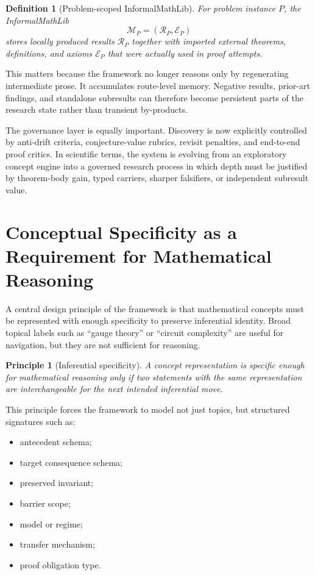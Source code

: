 \documentclass[11pt]{article}
\newtheorem{definition}{Definition}
\newtheorem{principle}{Principle}
\begin{document}
\begin{definition}[Problem-scoped InformalMathLib]
For problem instance $P$, the InformalMathLib
\[
\mathcal{M}_P = (\mathcal{R}_P, \mathcal{E}_P)
\]
stores locally produced results $\mathcal{R}_P$ together with imported external theorems, definitions, and axioms $\mathcal{E}_P$ that were actually used in proof attempts.
\end{definition}

This matters because the framework no longer reasons only by regenerating intermediate prose. It accumulates route-level memory. Negative results, prior-art findings, and standalone subresults can therefore become persistent parts of the research state rather than transient by-products.

The governance layer is equally important. Discovery is now explicitly controlled by anti-drift criteria, conjecture-value rubrics, revisit penalties, and end-to-end proof critics. In scientific terms, the system is evolving from an exploratory concept engine into a governed research process in which depth must be justified by theorem-body gain, typed carriers, sharper falsifiers, or independent subresult value.

\section{Conceptual Specificity as a Requirement for Mathematical Reasoning}

A central design principle of the framework is that mathematical concepts must be represented with enough specificity to preserve inferential identity. Broad topical labels such as ``gauge theory'' or ``circuit complexity'' are useful for navigation, but they are not sufficient for reasoning.

\begin{principle}[Inferential specificity]
A concept representation is specific enough for mathematical reasoning only if two statements with the same representation are interchangeable for the next intended inferential move.
\end{principle}

This principle forces the framework to model not just topics, but structured signatures such as:

\begin{itemize}[leftmargin=*,itemsep=0.2em]
\item antecedent schema;
\item target consequence schema;
\item preserved invariant;
\item barrier scope;
\item model or regime;
\item transfer mechanism;
\item proof obligation type.
\end{itemize}
\end{document}
